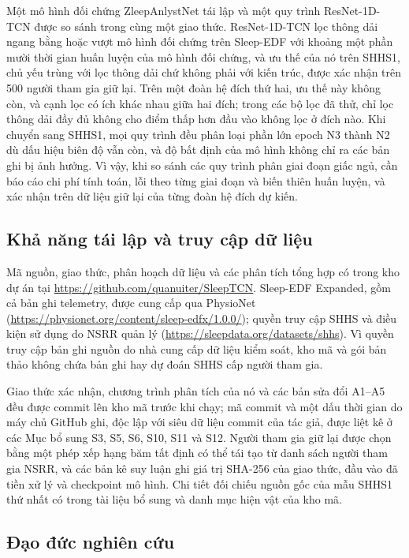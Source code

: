 \documentclass[11pt,a4paper]{article}
\begin{document}
Một mô hình đối chứng ZleepAnlystNet tái lập và một quy trình ResNet-1D-TCN được so sánh trong cùng một giao thức.
ResNet-1D-TCN lọc thông dải ngang bằng hoặc vượt mô hình đối chứng trên Sleep-EDF với khoảng một phần mười thời gian
huấn luyện của mô hình đối chứng, và ưu thế của nó trên SHHS1, chủ yếu trùng với lọc thông dải chứ không phải với
kiến trúc, được xác nhận trên 500 người tham gia giữ lại. Trên một đoàn hệ đích thứ hai, ưu thế này không còn, và
cạnh lọc có ích khác nhau giữa hai đích; trong các bộ lọc đã thử, chỉ lọc thông dải đầy đủ không cho điểm thấp hơn
đầu vào không lọc ở đích nào. Khi chuyển sang SHHS1, mọi quy trình đều phân loại phần lớn epoch N3 thành N2 dù dấu
hiệu biên độ vẫn còn, và độ bất định của mô hình không chỉ ra các bản ghi bị ảnh hưởng. Vì vậy, khi so sánh các quy
trình phân giai đoạn giấc ngủ, cần báo cáo chi phí tính toán, lỗi theo từng giai đoạn và biến thiên huấn luyện, và
xác nhận trên dữ liệu giữ lại của từng đoàn hệ đích dự kiến.

\subsection*{Khả năng tái lập và truy cập dữ liệu}

Mã nguồn, giao thức, phân hoạch dữ liệu và các phân tích tổng hợp có trong kho dự án tại
\url{https://github.com/quanuiter/SleepTCN}. Sleep-EDF Expanded, gồm cả bản ghi telemetry, được cung cấp qua PhysioNet
(\url{https://physionet.org/content/sleep-edfx/1.0.0/}); quyền truy cập SHHS và điều kiện sử dụng do NSRR quản lý
(\url{https://sleepdata.org/datasets/shhs}). Vì quyền truy cập bản ghi nguồn do nhà cung cấp dữ liệu kiểm soát, kho
mã và gói bản thảo không chứa bản ghi hay dự đoán SHHS cấp người tham gia.

Giao thức xác nhận, chương trình phân tích của nó và các bản sửa đổi A1--A5 đều được commit lên kho mã trước khi chạy;
mã commit và một dấu thời gian do máy chủ GitHub ghi, độc lập với siêu dữ liệu commit của tác giả, được liệt kê ở các
Mục bổ sung S3, S5, S6, S10, S11 và S12. Người tham gia giữ lại được chọn bằng một phép xếp hạng băm tất định có thể tái
tạo từ danh sách người tham gia NSRR, và các bản kê suy luận ghi giá trị SHA-256 của giao thức, đầu vào đã tiền xử lý và
checkpoint mô hình. Chi tiết đối chiếu nguồn gốc của mẫu SHHS1 thứ nhất có trong tài liệu bổ sung và danh mục hiện vật
của kho mã.

\subsection*{Đạo đức nghiên cứu}
\end{document}
